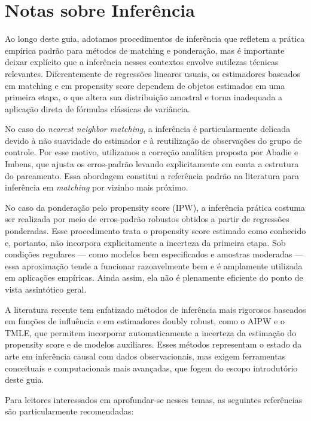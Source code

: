 \section{Notas sobre Inferência}

Ao longo deste guia, adotamos procedimentos de inferência que refletem a prática empírica padrão para métodos de matching e ponderação, mas é importante deixar explícito que a inferência nesses contextos envolve sutilezas técnicas relevantes. Diferentemente de regressões lineares usuais, os estimadores baseados em matching e em propensity score dependem de objetos estimados em uma primeira etapa, o que altera sua distribuição amostral e torna inadequada a aplicação direta de fórmulas clássicas de variância.

No caso do \textit{nearest neighbor matching}, a inferência é particularmente delicada devido à não suavidade do estimador e à reutilização de observações do grupo de controle. Por esse motivo, utilizamos a correção analítica proposta por Abadie e Imbens, que ajusta os erros-padrão levando explicitamente em conta a estrutura do pareamento. Essa abordagem constitui a referência padrão na literatura para inferência em \textit{matching} por vizinho mais próximo.

No caso da ponderação pelo propensity score (IPW), a inferência prática costuma ser realizada por meio de erros-padrão robustos obtidos a partir de regressões ponderadas. Esse procedimento trata o propensity score estimado como conhecido e, portanto, não incorpora explicitamente a incerteza da primeira etapa. Sob condições regulares — como modelos bem especificados e amostras moderadas — essa aproximação tende a funcionar razoavelmente bem e é amplamente utilizada em aplicações empíricas. Ainda assim, ela não é plenamente eficiente do ponto de vista assintótico geral.

A literatura recente tem enfatizado métodos de inferência mais rigorosos baseados em funções de influência e em estimadores doubly robust, como o AIPW e o TMLE, que permitem incorporar automaticamente a incerteza da estimação do propensity score e de modelos auxiliares. Esses métodos representam o estado da arte em inferência causal com dados observacionais, mas exigem ferramentas conceituais e computacionais mais avançadas, que fogem do escopo introdutório deste guia.

Para leitores interessados em aprofundar-se nesses temas, as seguintes referências são particularmente recomendadas:


